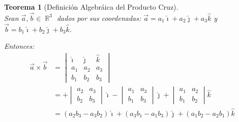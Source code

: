 \documentclass[12pt, fleqn]{report}                             %
\newcommand \ForceNewLine       {$\Space$\\}                    %
\DeclareMathOperator \Space     {\quad}                         %
\newtheorem{Theorem}        {Teorema}[section]                  %
\theoremstyle{break}                                            %
\DeclareMathOperator \Reals        {\mathbb{R}}                 %
\newcommand{\hati}      {\hat{\imath}}                           %
\newcommand{\hatj}      {\hat{\jmath}}                           %
\newcommand{\hatk}      {\hat{k}}                                %
\newcommand{\lVector}[1]                                        %
        { \ensuremath{\begin{vmatrix}#1\end{vmatrix}} }             %
\begin{document}
                \vspace{1em}
                \begin{Theorem}[Definición Algebráica del Producto Cruz]
                    \ForceNewLine
                    Sean $\vec{a}, \vec{b} \in \Reals^3$ dados por sus coordenadas:
                    $\vec{a}=a_1\hati + a_2\hatj + a_3\hatk$ y $\vec{b} = b_1\hati + b_2\hatj + b_3\hatk$.

                    Entonces:
                    \begin{align}
                        \vec{a} \times \vec{b} 
                            &= 
                                \lVector{\hati & \hatj & \hatk \\ a_1 & a_2 & a_3 \\ b_1 & b_2 & b_3}           \\
                            &= 
                                + \lVector{a_2 & a_3 \\ b_2 & b_3} \hati
                                - \lVector{a_1 & a_3 \\ b_1 & b_3} \hatj
                                + \lVector{a_1 & a_2 \\ b_1 & b_2} \hatk                                        \\
                            &= 
                                (a_2b_3 - a_3b_2)\hati + (a_3b_1 - a_1b_3)\hatj + (a_1b_2 - a_2b_1)\hatk
                    \end{align}
                \end{Theorem}
            
\end{document}
